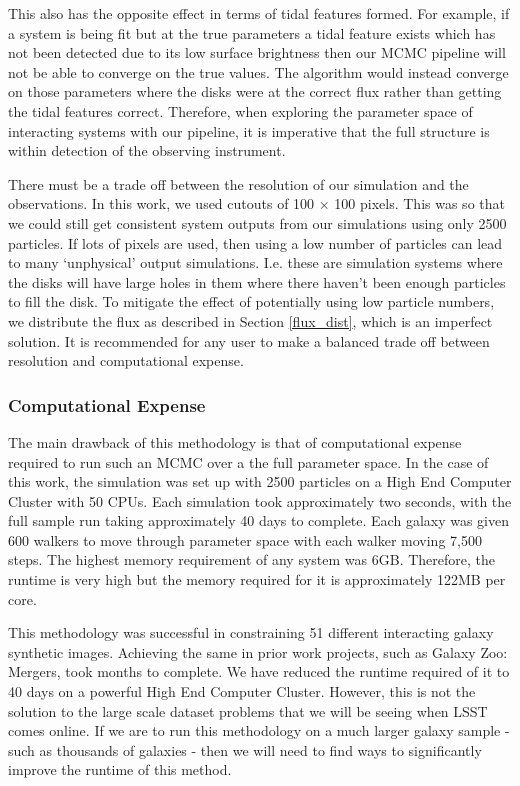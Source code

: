 This also has the opposite effect in terms of tidal features formed. For example, if a system is being fit but at the true parameters a tidal feature exists which has not been detected due to its low surface brightness then our MCMC pipeline will not be able to converge on the true values. The algorithm would instead converge on those parameters where the disks were at the correct flux rather than getting the tidal features correct. Therefore, when exploring the parameter space of interacting systems with our pipeline, it is imperative that the full structure is within detection of the observing instrument.

There must be a trade off between the resolution of our simulation and the observations. In this work, we used cutouts of 100 $\times$ 100 pixels. This was so that we could still get consistent system outputs from our simulations using only 2500 particles. If lots of pixels are used, then using a low number of particles can lead to many `unphysical' output simulations. I.e. these are simulation systems where the disks will have large holes in them where there haven't been enough particles to fill the disk. To mitigate the effect of potentially using low particle numbers, we distribute the flux as described in Section \ref{flux_dist}, which is an imperfect solution. It is recommended for any user to make a balanced trade off between resolution and computational expense.

\subsubsection{Computational Expense}\label{computational_expense}
\noindent The main drawback of this methodology is that of computational expense required to run such an MCMC over a the full parameter space. In the case of this work, the simulation was set up with 2500 particles on a High End Computer Cluster with 50 CPUs. Each simulation took approximately two seconds, with the full sample run taking approximately 40 days to complete. Each galaxy was given 600 walkers to move through parameter space with each walker moving 7,500 steps. The highest memory requirement of any system was 6GB. Therefore, the runtime is very high but the memory required for it is approximately 122MB per core.

This methodology was successful in constraining 51 different interacting galaxy synthetic images. Achieving the same in prior work projects, such as Galaxy Zoo: Mergers, took months to complete. We have reduced the runtime required of it to 40 days on a powerful High End Computer Cluster. However, this is not the solution to the large scale dataset problems that we will be seeing when LSST comes online. If we are to run this methodology on a much larger galaxy sample - such as thousands of galaxies - then we will need to find ways to significantly improve the runtime of this method.

